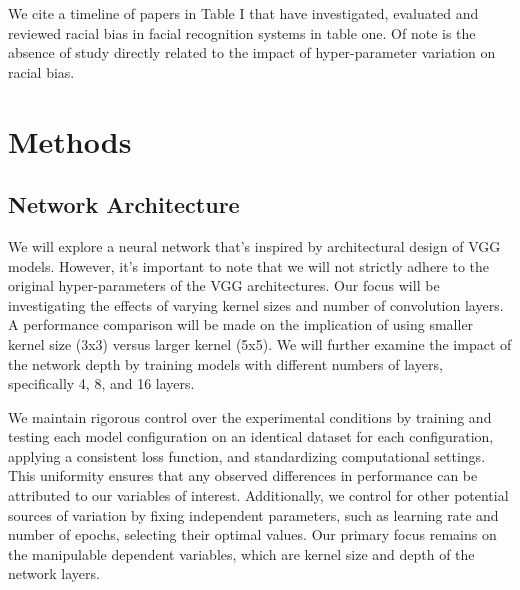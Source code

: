 \documentclass[conference]{IEEEtran}
\begin{document}
We cite a timeline of papers in Table I that have investigated, evaluated and reviewed racial bias in facial recognition systems in table one. Of note is the absence of study directly related to the impact of hyper-parameter variation on racial bias.

\section{Methods}
\subsection{Network Architecture}
We will explore a neural network that’s inspired by architectural design of VGG models. However, it’s important to note that we will not strictly adhere to the original hyper-parameters of the VGG architectures. Our focus will be investigating the effects of varying kernel sizes and number of convolution layers. A performance comparison will be made on the implication of using smaller kernel size (3x3) versus larger kernel (5x5). We will further examine the impact of the network depth by training models with different numbers of layers, specifically 4, 8, and 16 layers.


We maintain rigorous control over the experimental conditions by training and testing each model configuration on an identical dataset for each configuration, applying a consistent loss function, and standardizing computational settings. This uniformity ensures that any observed differences in performance can be attributed to our variables of interest. Additionally, we control for other potential sources of variation by fixing independent parameters, such as learning rate and number of epochs, selecting their optimal values. Our primary focus remains on the manipulable dependent variables, which are kernel size and depth of the network layers.
\end{document}
